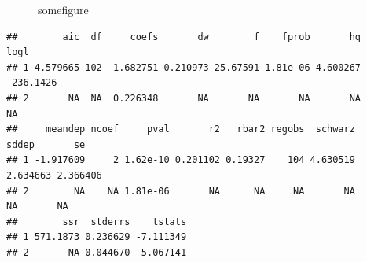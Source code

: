 \documentclass[
]{article}
\begin{document}
\begin{figure}[h]

{\centering {}

}

\caption{somefigure}\label{fig:mychunk}
\end{figure}

\begin{verbatim}
##        aic  df     coefs       dw        f    fprob       hq      logl
## 1 4.579665 102 -1.682751 0.210973 25.67591 1.81e-06 4.600267 -236.1426
## 2       NA  NA  0.226348       NA       NA       NA       NA        NA
##     meandep ncoef     pval       r2   rbar2 regobs  schwarz    sddep       se
## 1 -1.917609     2 1.62e-10 0.201102 0.19327    104 4.630519 2.634663 2.366406
## 2        NA    NA 1.81e-06       NA      NA     NA       NA       NA       NA
##        ssr  stderrs    tstats
## 1 571.1873 0.236629 -7.111349
## 2       NA 0.044670  5.067141
\end{verbatim}
\end{document}
